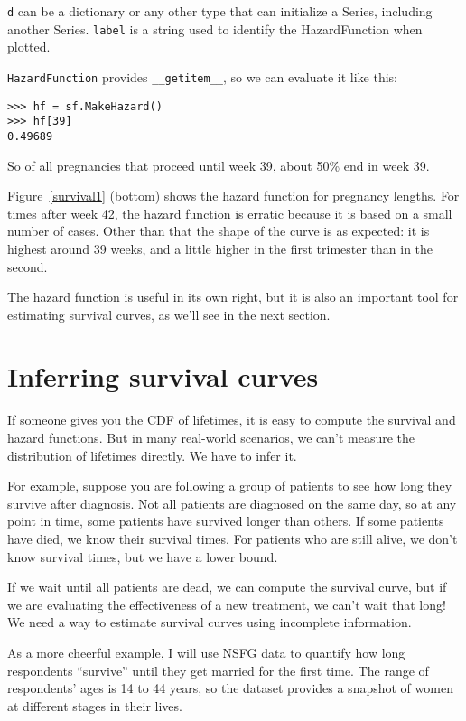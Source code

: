 \documentclass[12pt]{book}
\begin{document}
{\tt d} can be a dictionary or any other type that can initialize
a Series, including another Series.  {\tt label} is a string used
to identify the HazardFunction when plotted.

{\tt HazardFunction} provides \verb"__getitem__", so we can evaluate
it like this:

\begin{verbatim}
>>> hf = sf.MakeHazard()
>>> hf[39]
0.49689
\end{verbatim}

So of all pregnancies that proceed until week 39, about
50\% end in week 39.

Figure~\ref{survival1} (bottom) shows the hazard function for
pregnancy lengths.  For times after week 42, the hazard function
is erratic because it is based on a small number of cases.
Other than that the shape of the curve is as expected: it is
highest around 39 weeks, and a little higher in the first
trimester than in the second.

The hazard function is useful in its own right, but it is also an
important tool for estimating survival curves, as we'll see in the
next section.


\section{Inferring survival curves}

If someone gives you the CDF of lifetimes, it is easy to compute the
survival and hazard functions.  But in many real-world
scenarios, we can't measure the distribution of lifetimes directly.
We have to infer it.

For example, suppose you are following a group of patients to see how
long they survive after diagnosis.  Not all patients are diagnosed on
the same day, so at any point in time, some patients have survived
longer than others.  If some patients have died, we know their
survival times.  For patients who are still alive, we don't know
survival times, but we have a lower bound.

If we wait until all patients are dead, we can compute the survival
curve, but if we are evaluating the effectiveness of a new treatment,
we can't wait that long!  We need a way to estimate survival curves
using incomplete information.

As a more cheerful example, I will use NSFG data to quantify how
long respondents ``survive'' until they get married for the
first time.  The range of respondents' ages is 14 to 44 years, so
the dataset provides a snapshot of women at different stages in their
lives.
\end{document}
